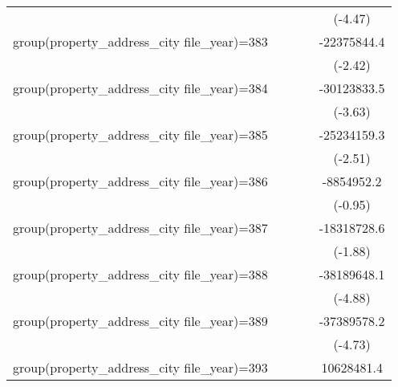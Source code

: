 {\begin{tabular}{l*{4}{c}}
                    &                     &                     &                     &     (-4.47)         \\
\addlinespace
group(property\_address\_city file\_year)=383&                     &                     &                     & -22375844.4\sym{*}  \\
                    &                     &                     &                     &     (-2.42)         \\
\addlinespace
group(property\_address\_city file\_year)=384&                     &                     &                     & -30123833.5\sym{***}\\
                    &                     &                     &                     &     (-3.63)         \\
\addlinespace
group(property\_address\_city file\_year)=385&                     &                     &                     & -25234159.3\sym{*}  \\
                    &                     &                     &                     &     (-2.51)         \\
\addlinespace
group(property\_address\_city file\_year)=386&                     &                     &                     &  -8854952.2         \\
                    &                     &                     &                     &     (-0.95)         \\
\addlinespace
group(property\_address\_city file\_year)=387&                     &                     &                     & -18318728.6         \\
                    &                     &                     &                     &     (-1.88)         \\
\addlinespace
group(property\_address\_city file\_year)=388&                     &                     &                     & -38189648.1\sym{***}\\
                    &                     &                     &                     &     (-4.88)         \\
\addlinespace
group(property\_address\_city file\_year)=389&                     &                     &                     & -37389578.2\sym{***}\\
                    &                     &                     &                     &     (-4.73)         \\
\addlinespace
group(property\_address\_city file\_year)=393&                     &                     &                     &  10628481.4         \\

\end{tabular}}
